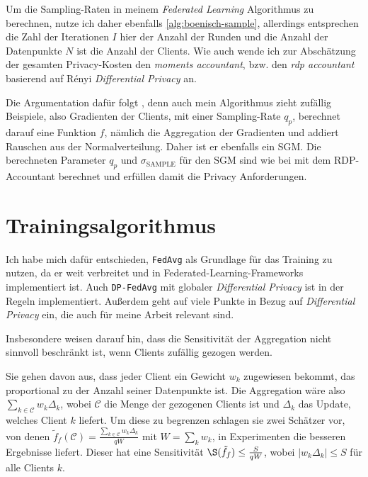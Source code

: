 Um die Sampling-Raten in meinem \textit{Federated Learning} Algorithmus zu berechnen, nutze ich daher ebenfalls \autoref{alg:boenisch-sample}, allerdings entsprechen die Zahl der Iterationen $I$ hier der Anzahl der Runden und die Anzahl der Datenpunkte $N$ ist die Anzahl der Clients. Wie auch \textcite{mcmahan:2018, boenisch:2023} wende ich zur Abschätzung der gesamten Privacy-Kosten den \textit{moments accountant}, bzw. den \textit{rdp accountant} \cite{wang:2020} basierend auf Rényi \textit{Differential Privacy} \cite{mironov:2017} an.

Die Argumentation dafür folgt \textcite{boenisch:2023}, denn auch mein Algorithmus zieht zufällig Beispiele, also Gradienten der Clients, mit einer Sampling-Rate $q_p$, berechnet darauf eine Funktion $f$, nämlich die Aggregation der Gradienten und addiert Rauschen aus der Normalverteilung. Daher ist er ebenfalls ein SGM. Die berechneten Parameter $q_p$ und $\sigma_{\text{SAMPLE}}$ für den SGM sind wie bei \citeauthor{boenisch:2023} mit dem RDP-Accountant berechnet und erfüllen damit die Privacy Anforderungen.

\section{Trainingsalgorithmus}
Ich habe mich dafür entschieden, \texttt{FedAvg} als Grundlage für das Training zu nutzen, da er weit verbreitet und in Federated-Learning-Frameworks implementiert ist. Auch \texttt{DP-FedAvg} mit globaler \textit{Differential Privacy} \cite{mcmahan:2018} ist in der Regeln implementiert. Außerdem geht \textcite{mcmahan:2018} auf viele Punkte in Bezug auf \textit{Differential Privacy} ein, die auch für meine Arbeit relevant sind. 

Insbesondere weisen \citeauthor{mcmahan:2018} darauf hin, dass die Sensitivität der Aggregation nicht sinnvoll beschränkt ist, wenn Clients zufällig gezogen werden. 

Sie gehen davon aus, dass jeder Client ein Gewicht $w_k$ zugewiesen bekommt, das proportional zu der Anzahl seiner Datenpunkte ist. Die Aggregation wäre also $\sum_{k \in \mathcal{C}} w_k \Delta_k$, wobei $\mathcal{C}$ die Menge der gezogenen Clients ist und $\Delta_k$ das Update, welches Client $k$ liefert. Um diese zu begrenzen schlagen sie zwei Schätzer vor, von denen $\tilde{f}_f(\mathcal{C}) = \frac{\sum_{k \in \mathcal{C}} w_k \Delta_k}{qW}$ mit $W = \sum_k{w_k}$, in Experimenten die besseren Ergebnisse liefert. Dieser hat eine Sensitivität $\S(\tilde{f}_f) \leq \frac{S}{qW}$, wobei $|w_k \Delta_k| \leq S$ für alle Clients $k$.

